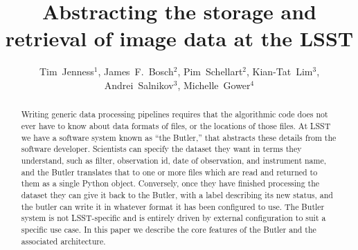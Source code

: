 \documentclass[11pt,twoside]{article}
\begin{document}
\title{Abstracting the storage and retrieval of image data at the LSST}

\author{Tim~Jenness$^1$,
James~F.~Bosch$^2$,
Pim~Schellart$^2$,
Kian-Tat~Lim$^3$,
Andrei~Salnikov$^3$,
Michelle~Gower$^4$
}



\begin{abstract}
  Writing generic data processing pipelines requires that the algorithmic code does not ever have to know about data formats of files, or the locations of those files.
  At LSST we have a software system known as ``the Butler,'' that abstracts these details from the software developer.
  Scientists can specify the dataset they want in terms they understand, such as filter, observation id, date of observation, and instrument name, and the Butler translates that to one or more files which are read and returned to them as a single Python object.
  Conversely, once they have finished processing the dataset they can give it back to the Butler, with a label describing its new status, and the butler can write it in whatever format it has been configured to use.
  The Butler system is not LSST-specific and is entirely driven by external configuration to suit a specific use case.
  In this paper we describe the core features of the Butler and the associated architecture.
\end{abstract}
\end{document}
